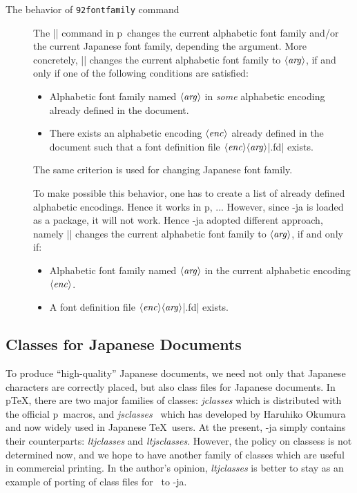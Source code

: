 \documentclass{ajt}
\begin{document}
\begin{description}
\item[The behavior of\/ {\tt\char92fontfamily\/} command]
The |\fontfamily| command in p\LaTeXe\ changes the current alphabetic
	   font family and/or the current Japanese font family,
	   depending the argument. More concretely,
	   || changes the
	   current alphabetic font family to $\langle\hbox{\it
	   arg\/}\rangle$, if and only if one of the following
	   conditions are satisfied:
\begin{itemize}
\item Alphabetic font family named $\langle\hbox{\it arg\/}\rangle$ in
      \emph{some} alphabetic encoding already defined in the document.
\item There exists an alphabetic encoding $\langle\hbox{\it
      enc\/}\rangle$ already defined in the document such that a font
      definition file $\langle\hbox{\it enc\/}\rangle\langle\hbox{\it
      arg\/}\rangle$|.fd| exists.
\end{itemize}
The same criterion is used for changing Japanese font family.

To make possible this behavior, one has to create a list of already
	   defined alphabetic encodings. Hence it works in p\LaTeXe, ...
However, since \LuaTeX-ja is loaded as a package, it will not
	   work. Hence \LuaTeX-ja adopted different approach, namely
	   || changes the
	   current alphabetic font family to $\langle\hbox{\it
	   arg\/}\rangle$, if and only if:
\begin{itemize}
\item Alphabetic font family named $\langle\hbox{\it arg\/}\rangle$ in
      the current alphabetic encoding $\langle\hbox{\it enc\/}\rangle$.
\item A  font definition file $\langle\hbox{\it enc\/}\rangle\langle\hbox{\it
      arg\/}\rangle$|.fd| exists.
\end{itemize}


\end{description}



\subsection{Classes for Japanese Documents}
To produce ``high-quality'' Japanese documents, we need not only that
Japanese characters are correctly placed, but also class files for
Japanese documents. In p\TeX, there are two major families of classes:
\emph{jclasses} which is distributed with the official p\LaTeXe\ macros,
and \emph{jsclasses}~\cite{jsclasses} which has developed by Haruhiko
Okumura and now widely used in Japanese \TeX\ users.  At the present,
\LuaTeX-ja simply contains their counterparts: \emph{ltjclasses} and
\emph{ltjsclasses}. However, the policy on classess is not determined
now, and we hope to have another family of classes which are useful in
commercial printing.  In the author's opinion, \emph{ltjclasses} is
better to stay as an example of porting of class files for \pTeX\ to
\LuaTeX-ja.
\end{document}
